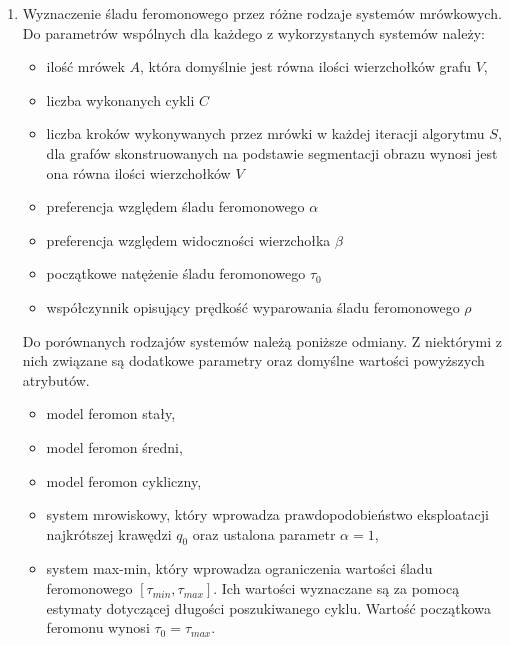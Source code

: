 {\begin{enumerate}
\begin{itemize}
            \item Metoda oparta o krawędzie. Do jej parametrów należy algorytm segmentacji oraz docelowa liczba
            segmentów $N_s$ związana z ilością krawędzi grafu. Podczas badań wykorzystano algorytmy prostego podziału na
            na prostokąty, algorytm k-średnich oraz algorytm \textit{SLIC} służący do konstrukcji superpikseli.
        \end{itemize}

        \item Wyznaczenie śladu feromonowego przez różne rodzaje systemów mrówkowych. Do parametrów wspólnych dla
        każdego z wykorzystanych systemów należy:
        \begin{itemize}
            \item ilość mrówek $A$, która domyślnie jest równa ilości wierzchołków grafu $V$,
            \item liczba wykonanych cykli $C$
            \item liczba kroków wykonywanych przez mrówki w każdej iteracji algorytmu $S$, dla grafów skonstruowanych na
            podstawie segmentacji obrazu wynosi jest ona równa ilości wierzchołków $V$
            \item preferencja względem śladu feromonowego $\alpha$
            \item preferencja względem widoczności wierzchołka $\beta$
            \item początkowe natężenie śladu feromonowego $\tau_0$
            \item współczynnik opisujący prędkość wyparowania śladu feromonowego $\rho$
        \end{itemize}

        Do porównanych rodzajów systemów należą poniższe odmiany. Z niektórymi z nich związane są dodatkowe parametry
        oraz domyślne wartości powyższych atrybutów.
        \begin{itemize}
            \item model feromon stały,
            \item model feromon średni,
            \item model feromon cykliczny,
            \item system mrowiskowy, który wprowadza prawdopodobieństwo eksploatacji najkrótszej krawędzi $q_0$ oraz
            ustalona parametr $\alpha = 1$,
            \item system max-min, który wprowadza ograniczenia wartości śladu feromonowego $[\tau_{min}, \tau_{max}]$.
            Ich wartości wyznaczane są za pomocą estymaty dotyczącej długości poszukiwanego cyklu. Wartość początkowa
            feromonu wynosi $\tau_0 = \tau_{max}$.
        \end{itemize}
    \end{enumerate}

}
